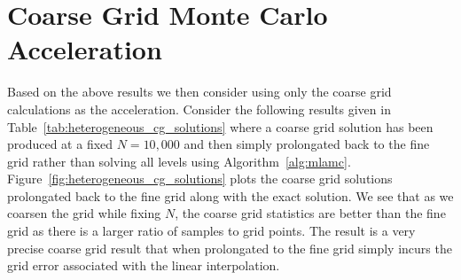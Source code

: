 \documentclass[note]{TechNote}
\begin{document}
\section{Coarse Grid Monte Carlo Acceleration}
Based on the above results we then consider using only the coarse grid
calculations as the acceleration. Consider the following results given
in Table~\ref{tab:heterogeneous_cg_solutions} where a coarse grid
solution has been produced at a fixed $N=10,000$ and then simply
prolongated back to the fine grid rather than solving all levels using
Algorithm~\ref{alg:mlamc}. Figure~\ref{fig:heterogeneous_cg_solutions}
plots the coarse grid solutions prolongated back to the fine grid
along with the exact solution. We see that as we coarsen the grid
while fixing $N$, the coarse grid statistics are better than the fine
grid as there is a larger ratio of samples to grid points. The result
is a very precise coarse grid result that when prolongated to the fine
grid simply incurs the grid error associated with the linear
interpolation.
\end{document}
